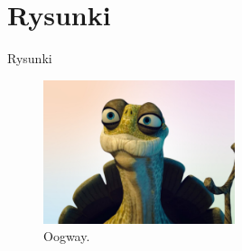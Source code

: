 \documentclass{beamer}
\begin{document}
\section{Rysunki}
\begin{frame}{Rysunki}
    \begin{figure}[h]
        \centering
        \includegraphics[width=0.5\textwidth]{rysunek1.png}
        \caption{Oogway.}
        \label{fig:rysunek1.png}
    \end{figure}
\end{frame}
\end{document}
